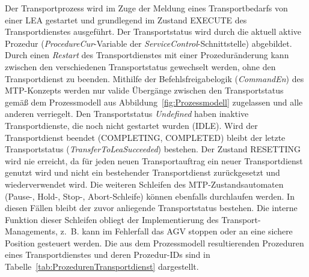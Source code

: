 Der Transportprozess wird im Zuge der Meldung eines Transportbedarfs von einer LEA gestartet und grundlegend im Zustand EXECUTE des Transportdienstes ausgeführt. Der Transportstatus wird durch die aktuell aktive Prozedur (\emph{ProcedureCur}-Variable der \emph{ServiceControl}-Schnittstelle) abgebildet. Durch einen \emph{Restart} des Transportdienstes mit einer Prozeduränderung kann zwischen den verschiedenen Transportstatus gewechselt werden, ohne den Transportdienst zu beenden. Mithilfe der Befehlsfreigabelogik (\emph{CommandEn}) des MTP-Konzepts werden nur valide Übergänge zwischen den Transportstatus gemäß dem Prozessmodell aus Abbildung~\ref{fig:Prozessmodell} zugelassen und alle anderen verriegelt. Den Transportstatus \emph{Undefined} haben inaktive Transportdienste, die noch nicht gestartet wurden (IDLE). Wird der Transportdienst beendet (COMPLETING, COMPLETED) bleibt der letzte Transportstatus (\emph{TransferToLeaSucceeded}) bestehen. Der Zustand RESETTING wird nie erreicht, da für jeden neuen Transportauftrag ein neuer Transportdienst genutzt wird und nicht ein bestehender Transportdienst zurückgesetzt und wiederverwendet wird. Die weiteren Schleifen des MTP-Zustandsautomaten (Pause-, Hold-, Stop-, Abort-Schleife) können ebenfalls durchlaufen werden. In diesen Fällen bleibt der zuvor anliegende Transportstatus bestehen. Die interne Funktion dieser Schleifen obliegt der Implementierung des Transport-Managements, z.~B. kann im Fehlerfall das AGV stoppen oder an eine sichere Position gesteuert werden. Die aus dem Prozessmodell resultierenden Prozeduren eines Transportdienstes und deren Prozedur-IDs sind in Tabelle~\ref{tab:ProzedurenTransportdienst} dargestellt.

